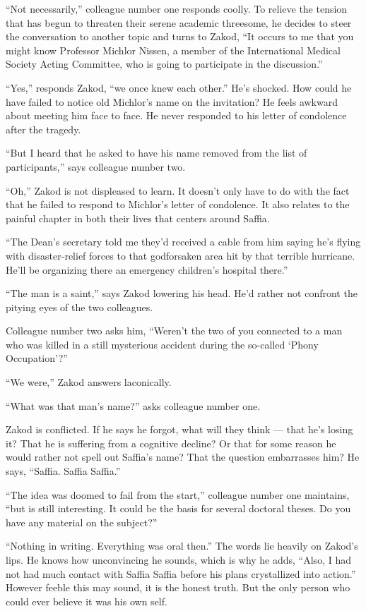 \documentclass[twoside,11pt,openany]{book}
\begin{document}
``Not necessarily,'' colleague number one responds coolly. To relieve the tension that has
begun to threaten their serene academic threesome, he decides to steer the conversation to another topic and turns to
Zakod, ``It occurs to me that you might know Professor Michlor Nissen, a member of the International
Medical Society Acting Committee, who is going to participate in the discussion.''

``Yes,'' responds Zakod, ``we once knew each other.'' He's shocked.
How could he have failed to notice old Michlor's name on the invitation? He feels awkward about meeting  him face to
face. He never responded to his letter of condolence after the tragedy.

``But I heard that he asked to have his name removed from the list of participants,'' says
colleague number two.

``Oh,'' Zakod is not displeased to learn. It doesn't only have to do with the fact that he
failed to respond to Michlor's letter of condolence. It also relates to the painful chapter in both their lives that
centers around Saffia.

``The Dean's secretary told me they'd received a cable from him saying he's flying with disaster-relief
forces to{ }that godforsaken area hit by that terrible hurricane. He'll be organizing there an
emergency children's hospital there.''

``The man is a saint,'' says Zakod lowering his head. He'd rather not confront the pitying
eyes of the two colleagues.

Colleague number two asks him, ``Weren't the two of you connected to a man who was killed in a still
mysterious accident during the so-called `Phony Occupation'?''

``We were,'' Zakod answers laconically.

``What was that man's name?'' asks colleague number one.

Zakod is conflicted. If he says he forgot, what will they think --- that he's losing it?{ }That he is
suffering from a cognitive decline? Or that for some reason he would rather not spell out Saffia's name? That the
question embarrasses him? He says, ``Saffia. Saffia Saffia.''

``The idea was doomed to fail from the start,'' colleague number one maintains, ``but is still
interesting. It could be the basis for several doctoral theses. Do you have any material on the subject?''


``Nothing in writing. Everything was oral then.'' The words lie heavily on Zakod's lips. He
knows how unconvincing he sounds, which is why he adds, ``Also, I had not had much contact with Saffia
Saffia before his plans crystallized into action.'' However feeble this may sound, it is the honest truth.
But the only person who could ever believe it was his own self.
\end{document}
